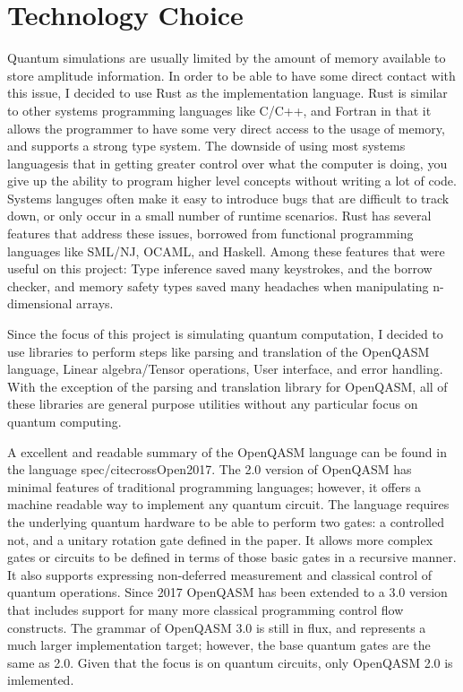 \documentclass[%
 reprint,
 amsmath,amssymb,
 aps,
]{revtex4-2}
\begin{document}
\section{\label{sec:level1} Technology Choice}
Quantum simulations are usually limited by the amount of memory available to store amplitude information. In order to be able to have some direct contact with this issue, I decided to use Rust as the implementation language. Rust is similar to other systems programming languages like C/C++, and Fortran in that it allows the programmer to have some very direct access to the usage of memory, and supports a strong type system. The downside of using most systems languagesis that in getting greater control over what the computer is doing, you give up the ability to program higher level concepts without writing a lot of code. Systems languges often make it easy to introduce bugs that are difficult to track down, or only occur in a small number of runtime scenarios. Rust has several features that address these issues, borrowed from functional programming languages like SML/NJ, OCAML, and Haskell. Among these features that were useful on this project: Type inference saved many keystrokes, and the borrow checker, and memory safety types saved many headaches when manipulating n-dimensional arrays.

Since the focus of this project is simulating quantum computation, I decided to use libraries to perform steps like parsing and translation of the OpenQASM language, Linear algebra/Tensor operations, User interface, and error handling. With the exception of the parsing and translation library for OpenQASM, all of these libraries are general purpose utilities without any particular focus on quantum computing. 

A excellent and readable summary of the OpenQASM language can be found in the language spec/cite{crossOpen2017}. The 2.0 version of OpenQASM has minimal features of traditional programming languages; however, it offers a machine readable way to implement any quantum circuit. The language requires the underlying quantum hardware to be able to perform two gates: a controlled not, and a unitary rotation gate defined in the paper. It allows more complex gates or circuits to be defined in terms of those basic gates in a recursive manner. It also supports expressing non-deferred measurement and classical control of quantum operations. Since 2017 OpenQASM has been extended to a 3.0 version that includes support for many more classical programming control flow constructs. The grammar of OpenQASM 3.0 is still in flux, and represents a much larger implementation target; however, the base quantum gates are the same as 2.0\cite{crossOpenQASM}. Given that the focus is on quantum circuits, only OpenQASM 2.0 is imlemented.
\end{document}
